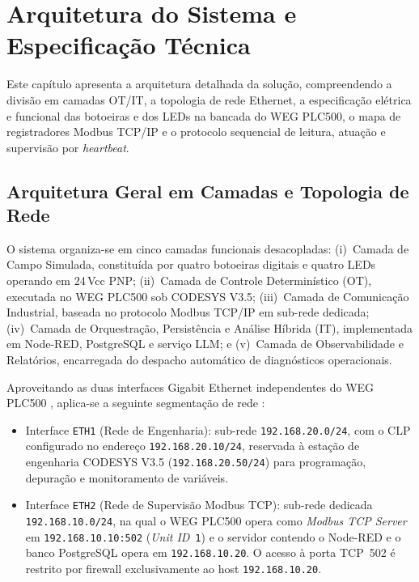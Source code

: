 
\chapter{Arquitetura do Sistema e Especificação Técnica}
\label{cap:arquitetura}

Este capítulo apresenta a arquitetura detalhada da solução, compreendendo a divisão em camadas OT/IT, a topologia de rede Ethernet, a especificação elétrica e funcional das botoeiras e dos LEDs na bancada do WEG PLC500, o mapa de registradores Modbus TCP/IP e o protocolo sequencial de leitura, atuação e supervisão por \textit{heartbeat}.

\section{Arquitetura Geral em Camadas e Topologia de Rede}
\label{sec:arq_geral}

O sistema organiza-se em cinco camadas funcionais desacopladas: (i)~Camada de Campo Simulada, constituída por quatro botoeiras digitais e quatro LEDs operando em 24\,Vcc PNP; (ii)~Camada de Controle Determinístico (OT), executada no WEG PLC500 sob CODESYS V3.5; (iii)~Camada de Comunicação Industrial, baseada no protocolo Modbus TCP/IP em sub-rede dedicada; (iv)~Camada de Orquestração, Persistência e Análise Híbrida (IT), implementada em Node-RED, PostgreSQL e serviço LLM; e (v)~Camada de Observabilidade e Relatórios, encarregada do despacho automático de diagnósticos operacionais.

Aproveitando as duas interfaces Gigabit Ethernet independentes do WEG PLC500 \cite{weg_plc500_manual}, aplica-se a seguinte segmentação de rede \cite{stouffer_nist_ot}:
\begin{itemize}
  \item Interface \texttt{ETH1} (Rede de Engenharia): sub-rede \texttt{192.168.20.0/24}, com o CLP configurado no endereço \texttt{192.168.20.10/24}, reservada à estação de engenharia CODESYS V3.5 (\texttt{192.168.20.50/24}) para programação, depuração e monitoramento de variáveis.
  \item Interface \texttt{ETH2} (Rede de Supervisão Modbus TCP): sub-rede dedicada \texttt{192.168.10.0/24}, na qual o WEG PLC500 opera como \textit{Modbus TCP Server} em \texttt{192.168.10.10:502} (\textit{Unit ID}~\texttt{1}) e o servidor contendo o Node-RED e o banco PostgreSQL opera em \texttt{192.168.10.20}. O acesso à porta TCP~502 é restrito por firewall exclusivamente ao host \texttt{192.168.10.20}.
\end{itemize}

